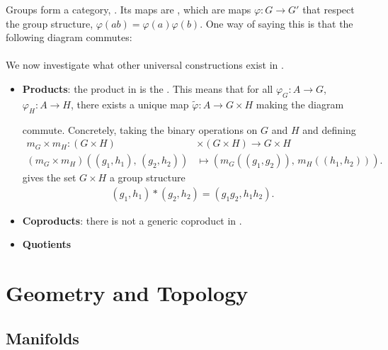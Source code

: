 \documentclass[11pt]{article}
\begin{document}
Groups form a category, . Its maps are ,
which are maps $\varphi \colon G \to G'$ that respect the group structure,
$\varphi(ab) = \varphi(a)\varphi(b)$. One way of saying this is that the
following diagram commutes:\\
\\
We now investigate what other universal constructions exist in .
\begin{itemize}
    \item \textbf{Products}: the product in  is the . This means that for all $\varphi_G \colon A \to G$, $\varphi_H \colon A \to H$,
    there exists a unique map $\widetilde{\varphi} \colon A \to G \times H$
    making the diagram
    \begin{center}
    \end{center}
    commute. Concretely, taking the binary operations on $G$
    and $H$ and defining
    \begin{align*}
        m_G \times m_H \colon (G \times H) & \times (G \times H) \to G \times H\\
        (m_G \times m_H)((g_1, h_1), \, (g_2, h_2)) & \mapsto (m_G((g_1, g_2)), \, m_H((h_1, h_2))).
    \end{align*}
    gives the set $G \times H$ a group structure
    \begin{align*}
        (g_1, h_1) * (g_2, h_2) = (g_1 g_2, h_1 h_2).
    \end{align*}
    \item \textbf{Coproducts}: there is not a generic coproduct in .
    \item \textbf{Quotients} 
\end{itemize}

\section{Geometry and Topology}

\subsection{Manifolds}
\end{document}
